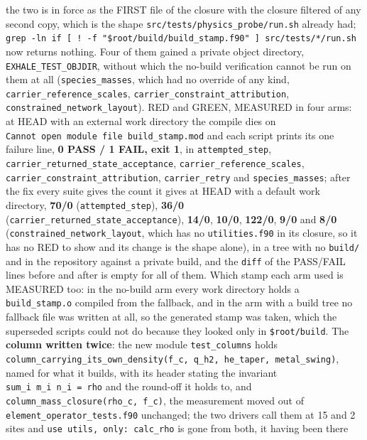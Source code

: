 \documentclass[english,a4paper]{my_memo}
\begin{document}
\begin{itemize}
  the two is in force as the FIRST file of the closure with the closure
  filtered of any second copy, which is the shape
  \texttt{src/tests/physics\_probe/run.sh} already had;
  \texttt{grep\ -ln\ \textquotesingle{}if\ {[}\ !\ -f\ "\$root/build/build\_stamp.f90"\ {]}\textquotesingle{}\ src/tests/*/run.sh}
  now returns nothing. Four of them gained a private object directory,
  \texttt{EXHALE\_TEST\_OBJDIR}, without which the no-build verification cannot be run
  on them at all (\texttt{species\_masses}, which had no override of any kind,
  \texttt{carrier\_reference\_scales}, \texttt{carrier\_constraint\_attribution},
  \texttt{constrained\_network\_layout}). RED and GREEN, MEASURED in four arms: at HEAD
  with an external work directory the compile dies on \texttt{Cannot\ open\ module\ file\ \textquotesingle{}build\_stamp.mod\textquotesingle{}} and each script prints its one failure line, \textbf{0 PASS / 1
  FAIL, exit 1}, in \texttt{attempted\_step}, \texttt{carrier\_returned\_state\_acceptance},
  \texttt{carrier\_reference\_scales}, \texttt{carrier\_constraint\_attribution},
  \texttt{carrier\_retry} and \texttt{species\_masses}; after the fix every suite gives the
  count it gives at HEAD with a default work directory, \textbf{70/0}
  (\texttt{attempted\_step}), \textbf{36/0} (\texttt{carrier\_returned\_state\_acceptance}),
  \textbf{14/0}, \textbf{10/0}, \textbf{122/0}, \textbf{9/0} and \textbf{8/0}
  (\texttt{constrained\_network\_layout}, which has no \texttt{utilities.f90} in its closure,
  so it has no RED to show and its change is the shape alone), in a tree with
  no \texttt{build/} and in the repository against a private build, and the \texttt{diff} of
  the PASS/FAIL lines before and after is empty for all of them. Which stamp
  each arm used is MEASURED too: in the no-build arm every work directory
  holds a \texttt{build\_stamp.o} compiled from the fallback, and in the arm with a
  build tree no fallback file was written at all, so the generated stamp was
  taken, which the superseded scripts could not do because they looked only in
  \texttt{\$root/build}. The \textbf{column written twice}: the new module \texttt{test\_columns}
  holds \texttt{column\_carrying\_its\_own\_density(f\_c,\ q\_h2,\ he\_taper,\ metal\_swing)},
  named for what it builds, with its header stating the invariant
  \texttt{sum\_i\ m\_i\ n\_i\ =\ rho} and the round-off it holds to, and
  \texttt{column\_mass\_closure(rho\_c,\ f\_c)}, the measurement moved out of
  \texttt{element\_operator\_tests.f90} unchanged; the two drivers call them at 15 and 2
  sites and \texttt{use\ utils,\ only:\ calc\_rho} is gone from both, it having been there

\end{itemize}
\end{document}
